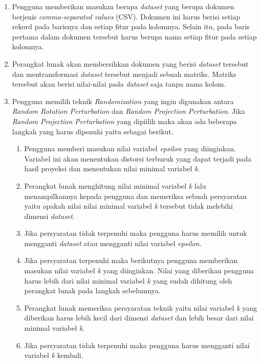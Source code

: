 \begin{enumerate}
    \item Pengguna memberikan masukan berupa \textit{dataset} yang berupa dokumen berjenis \textit{comma-separated values} (CSV). Dokumen ini harus berisi setiap rekord pada barisnya dan setiap fitur pada kolomnya. Selain itu, pada baris pertama dalam dokumen tersebut harus berupa nama setiap fitur pada setiap kolomnya.
    \item Perangkat lunak akan membersihkan dokumen yang berisi \textit{dataset} tersebut dan mentransformasi \textit{dataset} tersebut menjadi sebuah matriks. Matriks tersebut akan berisi nilai-nilai pada \textit{dataset} saja tanpa nama kolom.
    \item Pengguna memilih teknik \textit{Randomization} yang ingin digunakan antara \textit{Random Rotation Perturbation} dan \textit{Random Projection Perturbation}. Jika \textit{Random Projection Perturbation} yang dipiilih maka akan ada beberapa langkah yang harus dipenuhi yaitu sebagai berikut.
    \begin{enumerate}
        \item Pengguna memberi masukan nilai variabel \textit{epsilon} yang diinginkan. Variabel ini akan menentukan distorsi terburuk yang dapat terjadi pada hasil proyeksi dan menentukan nilai minimal variabel \textit{k}.
        \item Perangkat lunak menghitung nilai minimal variabel \textit{k} lalu menampilkannya kepada pengguna dan memeriksa sebuah persyaratan yaitu apakah nilai nilai minimal variabel \textit{k} tersebut tidak melebihi dimensi \textit{dataset}.
        \item Jika persyaratan tidak terpenuhi maka pengguna harus memilih untuk mengganti \textit{dataset} atau mengganti nilai variabel \textit{epsilon}.
        \item Jika persyaratan terpenuhi maka berikutnya pengguna memberikan masukan nilai variabel \textit{k} yang diinginkan. Nilai yang diberikan pengguna harus lebih dari nilai minimal variabel \textit{k} yang sudah dihitung oleh perangkat lunak pada langkah sebelumnya.
        \item Perangkat lunak memeriksa persyaratan teknik yaitu nilai variabel \textit{k} yang diberikan harus lebih kecil dari dimensi \textit{dataset} dan lebih besar dari nilai minimal variabel \textit{k}.
        \item Jika persyaratan tidak terpenuhi maka pengguna harus mengganti nilai variabel \textit{k} kembali.
    \end{enumerate}

\end{enumerate}
